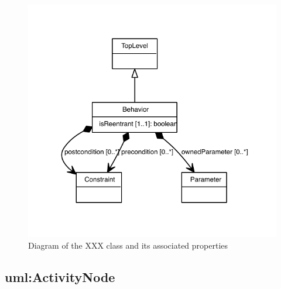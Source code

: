 \begin{figure}[ht]
\begin{center}
\includegraphics[scale=0.6]{uml_classes/Behavior_abstraction_hierarchy.pdf}
\caption[]{Diagram of the XXX class and its associated properties}
\label{uml:Behavior}
\end{center}
\end{figure}


\subsection{uml:ActivityNode}
\label{sec:uml:ActivityNode}


